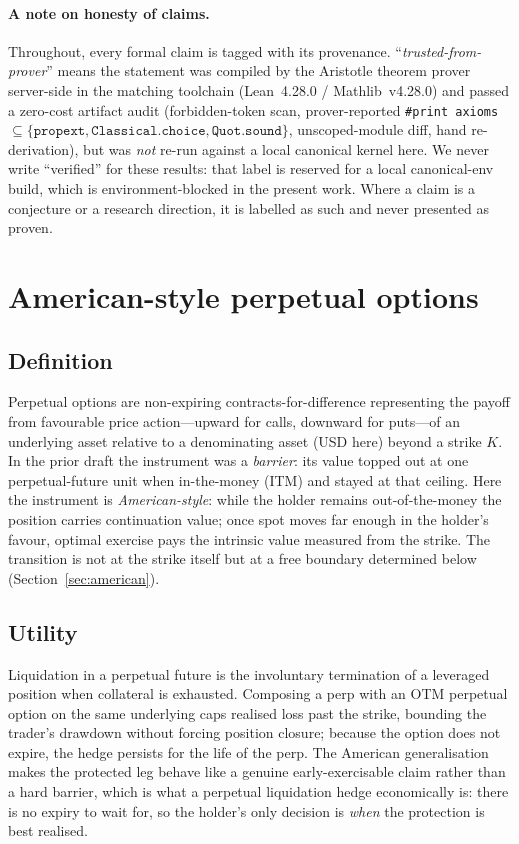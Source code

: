 \documentclass[runningheads]{llncs}
\newcommand{\tfp}{\emph{trusted-from-prover}}
\begin{document}
\paragraph{A note on honesty of claims.}
Throughout, every formal claim is tagged with its provenance. ``\tfp{}'' means
the statement was compiled by the Aristotle theorem prover server-side in the
matching toolchain (Lean~4.28.0 / Mathlib~v4.28.0) and passed a zero-cost
artifact audit (forbidden-token scan, prover-reported \texttt{\#print axioms}
$\subseteq\{\texttt{propext},\texttt{Classical.choice},\texttt{Quot.sound}\}$,
unscoped-module diff, hand re-derivation), but was \emph{not} re-run against a
local canonical kernel here. We never write ``verified'' for these results: that
label is reserved for a local canonical-env build, which is environment-blocked
in the present work. Where a claim is a conjecture or a research direction, it is
labelled as such and never presented as proven.

\section{American-style perpetual options}\label{sec:perp}

\subsection{Definition}
Perpetual options are non-expiring contracts-for-difference representing the
payoff from favourable price action---upward for calls, downward for
puts---of an underlying asset relative to a denominating asset (USD here)
beyond a strike $K$. In the prior draft the instrument was a \emph{barrier}: its
value topped out at one perpetual-future unit when in-the-money (ITM) and stayed
at that ceiling. Here the instrument is \emph{American-style}: while the holder
remains out-of-the-money the position carries continuation value; once spot moves
far enough in the holder's favour, optimal exercise pays the intrinsic value
measured from the strike. The transition is not at the strike itself but at a
free boundary determined below (Section~\ref{sec:american}).

\subsection{Utility}
Liquidation in a perpetual future is the involuntary termination of a leveraged
position when collateral is exhausted. Composing a perp with an OTM perpetual
option on the same underlying caps realised loss past the strike, bounding the
trader's drawdown without forcing position closure; because the option does not
expire, the hedge persists for the life of the perp. The American generalisation
makes the protected leg behave like a genuine early-exercisable claim rather than
a hard barrier, which is what a perpetual liquidation hedge economically is:
there is no expiry to wait for, so the holder's only decision is \emph{when} the
protection is best realised.
\end{document}
